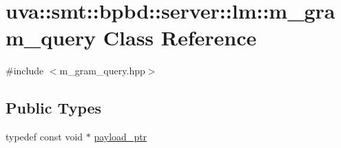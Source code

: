 \hypertarget{classuva_1_1smt_1_1bpbd_1_1server_1_1lm_1_1m__gram__query}{}\section{uva\+:\+:smt\+:\+:bpbd\+:\+:server\+:\+:lm\+:\+:m\+\_\+gram\+\_\+query Class Reference}
\label{classuva_1_1smt_1_1bpbd_1_1server_1_1lm_1_1m__gram__query}


{\ttfamily \#include $<$m\+\_\+gram\+\_\+query.\+hpp$>$}

\subsection*{Public Types}
\begin{DoxyCompactItemize}
\item 
typedef const void $\ast$ \hyperlink{classuva_1_1smt_1_1bpbd_1_1server_1_1lm_1_1m__gram__query_a41d3624069d1bbe3405ff4c7f6604c48}{payload\+\_\+ptr}
\end{DoxyCompactItemize}
